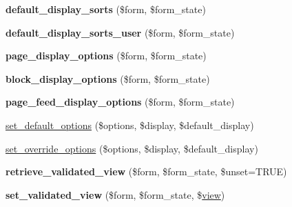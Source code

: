 \begin{DoxyCompactItemize}
\item 
\hypertarget{classViewsUiBaseViewsWizard_a1cd40551dd881c4a47c9c2ace335749e}{
{\bfseries default\_\-display\_\-sorts} (\$form, \$form\_\-state)}
\label{classViewsUiBaseViewsWizard_a1cd40551dd881c4a47c9c2ace335749e}

\item 
\hypertarget{classViewsUiBaseViewsWizard_a249f297815a65740f520bf3d12a4d980}{
{\bfseries default\_\-display\_\-sorts\_\-user} (\$form, \$form\_\-state)}
\label{classViewsUiBaseViewsWizard_a249f297815a65740f520bf3d12a4d980}

\item 
\hypertarget{classViewsUiBaseViewsWizard_a34d4c9255a42781ea2535e40bc9ff5c9}{
{\bfseries page\_\-display\_\-options} (\$form, \$form\_\-state)}
\label{classViewsUiBaseViewsWizard_a34d4c9255a42781ea2535e40bc9ff5c9}

\item 
\hypertarget{classViewsUiBaseViewsWizard_a5879a72ea9d8735d5e4efb8134d4ffce}{
{\bfseries block\_\-display\_\-options} (\$form, \$form\_\-state)}
\label{classViewsUiBaseViewsWizard_a5879a72ea9d8735d5e4efb8134d4ffce}

\item 
\hypertarget{classViewsUiBaseViewsWizard_ae830a5c4537497d3c0bc5515b1a44cbd}{
{\bfseries page\_\-feed\_\-display\_\-options} (\$form, \$form\_\-state)}
\label{classViewsUiBaseViewsWizard_ae830a5c4537497d3c0bc5515b1a44cbd}

\item 
\hyperlink{classViewsUiBaseViewsWizard_acbcdfdd0fd778fc37844d80348b4fe5f}{set\_\-default\_\-options} (\$options, \$display, \$default\_\-display)
\item 
\hyperlink{classViewsUiBaseViewsWizard_a480c82e9b10a7197b37845e18dc9748f}{set\_\-override\_\-options} (\$options, \$display, \$default\_\-display)
\item 
\hypertarget{classViewsUiBaseViewsWizard_aa4108ff682dca78e559121dac37044d7}{
{\bfseries retrieve\_\-validated\_\-view} (\$form, \$form\_\-state, \$unset=TRUE)}
\label{classViewsUiBaseViewsWizard_aa4108ff682dca78e559121dac37044d7}

\item 
\hypertarget{classViewsUiBaseViewsWizard_af1feead400602287a3437093b6c37be8}{
{\bfseries set\_\-validated\_\-view} (\$form, \$form\_\-state, \$\hyperlink{classview}{view})}
\label{classViewsUiBaseViewsWizard_af1feead400602287a3437093b6c37be8}

\end{DoxyCompactItemize}
